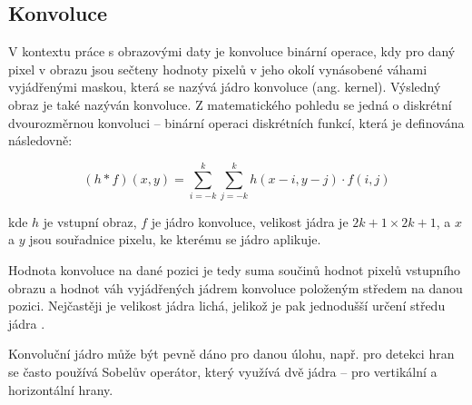 
\subsection{Konvoluce}

V kontextu práce s obrazovými daty je konvoluce binární operace, kdy pro daný
pixel v obrazu jsou sečteny hodnoty pixelů v jeho okolí vynásobené váhami
vyjádřenými maskou, která se nazývá jádro konvoluce (ang. kernel). Výsledný
obraz je také nazýván konvoluce. Z matematického pohledu se jedná o diskrétní
dvourozměrnou konvoluci – binární operaci diskrétních funkcí, která je
definována následovně:

\begin{equation*}
    (h*f)(x,y)=\sum _{i=-k}^{k}\sum _{j=-k}^{k}h(x-i,y-j)\cdot f(i,j)
\end{equation*}

kde $h$ je vstupní obraz, $f$ je jádro konvoluce, velikost jádra je $2k+1
    \times 2k+1$, a $x$ a $y$ jsou souřadnice pixelu, ke kterému se jádro aplikuje.

Hodnota konvoluce na dané pozici je tedy suma součinů hodnot pixelů vstupního
obrazu a hodnot váh vyjádřených jádrem konvoluce položeným středem na danou
pozici.
Nejčastěji je velikost jádra lichá, jelikož je pak jednodušší určení středu
jádra \cite{cnn_introduction}.



Konvoluční jádro může být pevně dáno pro danou úlohu, např. pro detekci hran se
často používá Sobelův operátor, který využívá dvě jádra – pro vertikální a
horizontální hrany.

